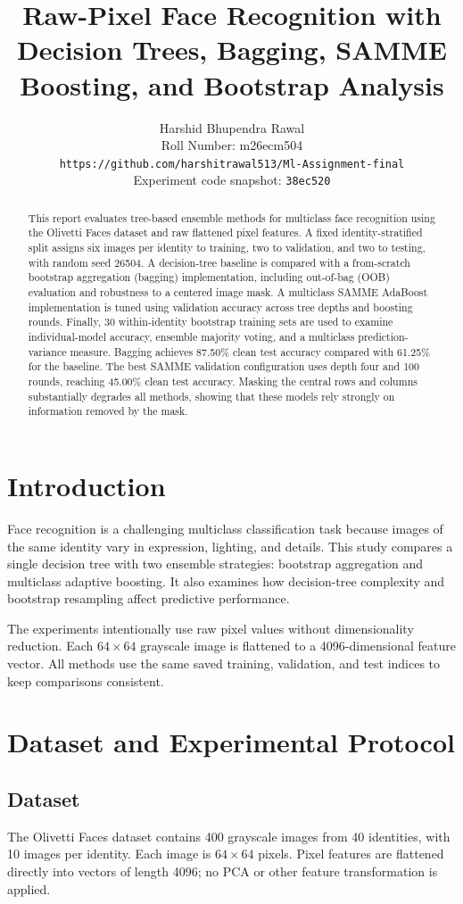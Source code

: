 \documentclass[10pt,twocolumn,letterpaper]{article}
\title{\bf Raw-Pixel Face Recognition with Decision Trees, Bagging, SAMME Boosting, and Bootstrap Analysis}
\author{
Harshid Bhupendra Rawal\\
Roll Number: m26ecm504\\
\texttt{https://github.com/harshitrawal513/Ml-Assignment-final}\\
Experiment code snapshot: \texttt{38ec520}
}
\begin{document}
\maketitle

\begin{abstract}
This report evaluates tree-based ensemble methods for multiclass face recognition using the Olivetti Faces dataset and raw flattened pixel features. A fixed identity-stratified split assigns six images per identity to training, two to validation, and two to testing, with random seed 26504. A decision-tree baseline is compared with a from-scratch bootstrap aggregation (bagging) implementation, including out-of-bag (OOB) evaluation and robustness to a centered image mask. A multiclass SAMME AdaBoost implementation is tuned using validation accuracy across tree depths and boosting rounds. Finally, 30 within-identity bootstrap training sets are used to examine individual-model accuracy, ensemble majority voting, and a multiclass prediction-variance measure. Bagging achieves 87.50\% clean test accuracy compared with 61.25\% for the baseline. The best SAMME validation configuration uses depth four and 100 rounds, reaching 45.00\% clean test accuracy. Masking the central rows and columns substantially degrades all methods, showing that these models rely strongly on information removed by the mask.
\end{abstract}

\section{Introduction}
Face recognition is a challenging multiclass classification task because images of the same identity vary in expression, lighting, and details. This study compares a single decision tree with two ensemble strategies: bootstrap aggregation and multiclass adaptive boosting. It also examines how decision-tree complexity and bootstrap resampling affect predictive performance.

The experiments intentionally use raw pixel values without dimensionality reduction. Each $64\times64$ grayscale image is flattened to a 4096-dimensional feature vector. All methods use the same saved training, validation, and test indices to keep comparisons consistent.

\section{Dataset and Experimental Protocol}
\subsection{Dataset}
The Olivetti Faces dataset contains 400 grayscale images from 40 identities, with 10 images per identity. Each image is $64\times64$ pixels. Pixel features are flattened directly into vectors of length 4096; no PCA or other feature transformation is applied.
\end{document}
